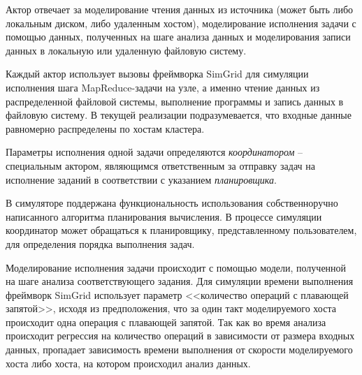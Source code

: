 \documentclass[../diploma.tex]{subfile}
\begin{document}
    Актор отвечает за моделирование чтения данных из источника (может быть либо
    локальным диском, либо удаленным хостом), моделирование исполнения задачи с
    помощью данных, полученных на шаге анализа данных и моделирования записи
    данных в локальную или удаленную файловую систему. 
    
    Каждый актор использует вызовы фреймворка SimGrid для симуляции исполнения
    шага MapReduce-задачи на узле, а именно чтение данных из распределенной
    файловой системы, выполнение программы и запись данных в файловую систему. В
    текущей реализации подразумевается, что входные данные равномерно
    распределены по хостам кластера.
    
    Параметры исполнения одной задачи определяются {\it координатором} --
    специальным актором, являющимся ответственным за отправку задач на
    исполнение заданий в соответствии с указанием {\it планировщика}. 

    В симуляторе поддержана функциональность использования собственноручно
    написанного алгоритма планирования вычисления. В процессе симуляции
    координатор может обращаться к планировщику, представленному пользователем,
    для определения порядка выполнения задач. 

    Моделирование исполнения задачи происходит с помощью модели, полученной на
    шаге анализа соответствующего задания. Для симуляции времени выполнения
    фреймворк SimGrid использует параметр <<количество операций с плавающей
    запятой>>, исходя из предположения, что за один такт моделируемого хоста
    происходит одна операция с плавающей запятой. Так как во время анализа
    происходит регрессия на количество операций в зависимости от размера входных
    данных, пропадает зависимость времени выполнения от скорости моделируемого
    хоста либо хоста, на котором происходил анализ данных.
\end{document}
